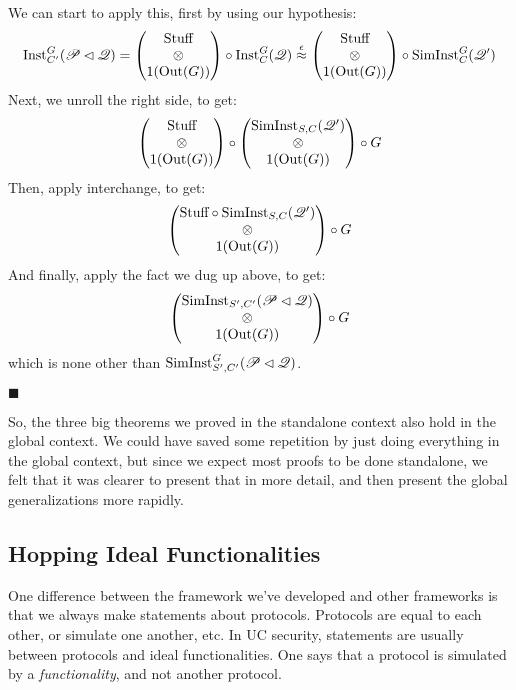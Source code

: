 \begin{theorem}
  We can start to apply this, first by using our hypothesis:
  $$
  \text{Inst}^G_{C'}(\mathscr{P} \lhd \mathscr{Q}) =
  \begin{pmatrix}
    \text{Stuff}\cr
    \otimes\cr
    1(\text{Out}(G))
  \end{pmatrix}
  \circ \text{Inst}^G_C(\mathscr{Q})
  \overset{\epsilon}{\approx}
  \begin{pmatrix}
    \text{Stuff}\cr
    \otimes\cr
    1(\text{Out}(G))
  \end{pmatrix}
  \circ \text{SimInst}^G_C(\mathscr{Q}')
  $$
  Next, we unroll the right side, to get:
  $$
  \begin{pmatrix}
    \text{Stuff}\cr
    \otimes\cr
    1(\text{Out}(G))
  \end{pmatrix}
  \circ
  \begin{pmatrix}
    \text{SimInst}_{S, C}(\mathscr{Q}')\cr
    \otimes\cr
    1(\text{Out}(G))
  \end{pmatrix}
  \circ
  G
  $$
  Then, apply interchange, to get:
  $$
  \begin{pmatrix}
    \text{Stuff} \circ \text{SimInst}_{S, C}(\mathscr{Q}')\cr
    \otimes\cr
    1(\text{Out}(G))
  \end{pmatrix}
  \circ
  G
  $$
  And finally, apply the fact we dug up above, to get:
  $$
  \begin{pmatrix}
    \text{SimInst}_{S', C'}(\mathscr{P} \lhd \mathscr{Q})\cr
    \otimes\cr
    1(\text{Out}(G))
  \end{pmatrix}
  \circ
  G
  $$
  which is none other than $\text{SimInst}^G_{S', C'}(\mathscr{P} \lhd \mathscr{Q})$.

  $\blacksquare$
\end{theorem}

So, the three big theorems we proved in the standalone context
also hold in the global context.
We could have saved some repetition by just doing everything in the global
context, but since we expect most proofs to be done standalone,
we felt that it was clearer to present that in more detail,
and then present the global generalizations more rapidly.

\subsection{Hopping Ideal Functionalities}

One difference between the framework we've developed and other
frameworks is that we always make statements about protocols.
Protocols are equal to each other, or simulate one another, etc.
In UC security, statements are usually between protocols and ideal functionalities.
One says that a protocol is simulated by a \emph{functionality},
and not another protocol.

